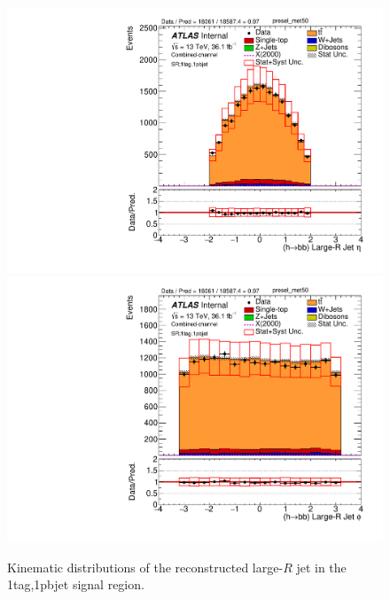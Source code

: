 \begin{figure}[!htbp]
\begin{center}
\includegraphics[scale=0.33]{./figures/boosted/Plot1tag1pbjet/DataMC_1tag_1pbjet_SR_lepton_presel_met50_HbbEta} 
\includegraphics[scale=0.33]{./figures/boosted/Plot1tag1pbjet/DataMC_1tag_1pbjet_SR_lepton_presel_met50_HbbPhi} 
\caption{Kinematic distributions of the reconstructed large-$R$ jet in the 1tag,1pbjet signal region.}
\label{fig:boosted_SR_1tag_1pbjet_largerjet}
\end{center}
\end{figure}

